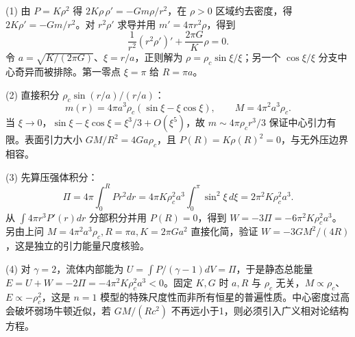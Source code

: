 (1) 由 \(P=K\rho^2\) 得 \(2K\rho\,\rho'=-Gm\rho/r^2\)，在 \(\rho>0\) 区域约去密度，得 \(2K\rho'=-Gm/r^2\)。对 \(r^2\rho'\) 求导并用 \(m'=4\pi r^2\rho\)，得到
\[
\frac1{r^2}(r^2\rho')'+\frac{2\pi G}{K}\rho=0.
\]
令 \(a=\sqrt{K/(2\pi G)}\)、\(\xi=r/a\)，正则解为
\(\rho=\rho_c\sin\xi/\xi\)；另一个 \(\cos\xi/\xi\) 分支中心奇异而被排除。第一零点 \(\xi=\pi\) 给 \(R=\pi a\)。

(2) 直接积分 \(\rho_c\sin(r/a)/(r/a)\)：
\[
m(r)=4\pi a^3\rho_c(\sin\xi-\xi\cos\xi),\qquad M=4\pi^2a^3\rho_c .
\]
当 \(\xi\to0\)，\(\sin\xi-\xi\cos\xi=\xi^3/3+O(\xi^5)\)，故 \(m\sim4\pi\rho_cr^3/3\) 保证中心引力有限。表面引力大小 \(GM/R^2=4G a\rho_c\)，且 \(P(R)=K\rho(R)^2=0\)，与无外压边界相容。

(3) 先算压强体积分：
\[
\Pi=4\pi\int_0^R P r^2dr
=4\pi K\rho_c^2a^3\int_0^\pi\sin^2\xi\,d\xi
=2\pi^2K\rho_c^2a^3.
\]
从 \(\int 4\pi r^3P'(r)dr\) 分部积分并用 \(P(R)=0\)，得到 \(W=-3\Pi=-6\pi^2K\rho_c^2a^3\)。另由上问 \(M=4\pi^2a^3\rho_c,R=\pi a,K=2\pi Ga^2\) 直接化简，验证
\(\boxed{W=-3GM^2/(4R)}\)，这是独立的引力能量尺度核验。

(4) 对 \(\gamma=2\)，流体内部能为 \(U=\int P/(\gamma-1)dV=\Pi\)，于是静态总能量 \(E=U+W=-2\Pi=-4\pi^2K\rho_c^2a^3<0\)。固定 \(K,G\) 时 \(a,R\) 与 \(\rho_c\) 无关，\(M\propto\rho_c\)、\(E\propto-\rho_c^2\)，这是 \(n=1\) 模型的特殊尺度性而非所有恒星的普遍性质。中心密度过高会破坏弱场牛顿近似，若 \(GM/(Rc^2)\) 不再远小于1，则必须引入广义相对论结构方程。
